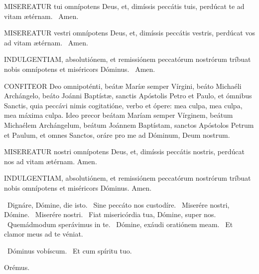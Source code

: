 
\lettrine[lines=2]{M}{ISEREATUR} tui omnípotens Deus, et, dimíssis peccátis tuis, perdúcat te ad vitam ætérnam. \R\ Amen.



\lettrine[lines=2]{M}{ISEREATUR} vestri omnípotens Deus, et, dimíssis peccátis vestris, perdúcat vos ad vitam ætérnam. \R\ Amen.

\lettrine[lines=2]{I}{NDULGENTIAM}, absolutiónem, et remissiónem peccatórum nostrórum tríbuat nobis omnípotens et miséricors Dóminus. \R\ Amen.


\lettrine[lines=2]{C}{ONFITEOR} Deo omnipoténti, beátæ Maríæ semper Vírgini, beáto Michaéli Archángelo, beáto Joánni Baptístæ, sanctis Apóstolis Petro et Paulo, et ómnibus Sanctis, quia peccávi nimis cogitatióne, verbo et ópere: mea culpa, mea culpa, mea máxima culpa. Ideo precor beátam Maríam semper Vírginem, beátum Michaélem Archángelum, beátum Joánnem Baptístam, sanctos Apóstolos Petrum et Paulum, et omnes Sanctos, oráre pro me ad Dóminum, Deum nostrum.


\lettrine[lines=2]{M}{ISEREATUR} nostri omnípotens Deus, et, dimíssis peccátis nostris, perdúcat nos ad vitam ætérnam. Amen.

\lettrine[lines=2]{I}{NDULGENTIAM}, absolutiónem, et remissiónem peccatórum nostrórum tríbuat nobis omnípotens et miséricors Dóminus. Amen.


\V\ Dignáre, Dómine, die isto. \R\ Sine peccáto nos custodíre. \V\ Miserére nostri, Dómine. \R\ Miserére nostri. \V\ Fiat misericórdia tua, Dómine, super nos. \R\ Quemádmodum sperávimus in te. \V\ Dómine, exáudi oratiónem meam. \R\ Et clamor meus ad te véniat.


\V\ Dóminus vobíscum. \R\ Et cum spíritu tuo.

Orémus. 

